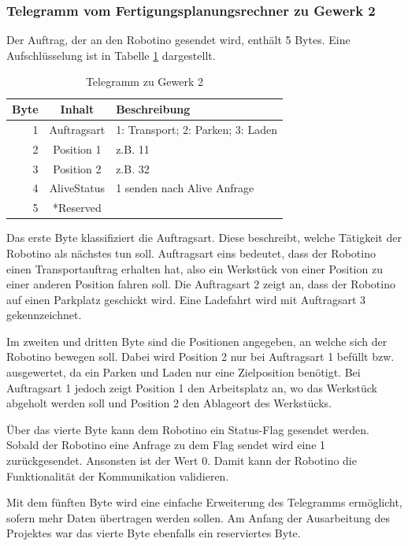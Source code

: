 \subsubsection{Telegramm vom Fertigungsplanungsrechner zu Gewerk 2}

Der Auftrag, der an den Robotino gesendet wird, enthält 5 Bytes. Eine Aufschlüsselung ist in Tabelle \ref{tab:TelegrammZuG2} dargestellt. 

\begin{table}[!ht]
	\centering
	\begin{tabular}{|r|c|l|}
		\hline
		Byte & Inhalt	&	Beschreibung \\
		\hline
			1  & Auftragsart & 1: Transport; 2: Parken; 3: Laden  \\
			2  & Position 1  & z.B. 11 \\
			3  & Position 2  & z.B. 32 \\
		  4  & AliveStatus & 1 senden nach Alive Anfrage \\
		  5  & *Reserved   &  \\
		\hline
	\end{tabular}
	\caption{Telegramm zu Gewerk 2}
	\label{tab:TelegrammZuG2}
\end{table}

Das erste Byte klassifiziert die Auftragsart. Diese beschreibt, welche Tätigkeit der Robotino als nächstes tun soll. Auftragsart eins bedeutet, dass der Robotino einen Transportauftrag erhalten hat, also ein Werkstück von einer Position zu einer anderen \Gls{Position} fahren soll. Die Auftragsart 2 zeigt an, dass der Robotino auf einen Parkplatz geschickt wird. Eine Ladefahrt wird mit Auftragsart 3 gekennzeichnet. 

Im zweiten und dritten Byte sind die Positionen angegeben, an welche sich der Robotino bewegen soll. Dabei wird Position 2 nur bei Auftragsart 1 befüllt bzw. ausgewertet, da ein Parken und Laden nur eine Zielposition benötigt. Bei Auftragsart 1 jedoch zeigt Position 1 den Arbeitsplatz an, wo das Werkstück abgeholt werden soll und Position 2 den Ablageort des Werkstücks. 

Über das vierte Byte kann dem Robotino ein Status-Flag gesendet werden. Sobald der Robotino eine Anfrage zu dem Flag sendet wird eine 1 zurückgesendet. Ansonsten ist der Wert 0. Damit kann der Robotino die Funktionalität der Kommunikation validieren.

Mit dem fünften Byte wird eine einfache Erweiterung des Telegramms ermöglicht, sofern mehr Daten übertragen werden sollen. Am Anfang der Ausarbeitung des Projektes war das vierte Byte ebenfalls ein reserviertes Byte. 

